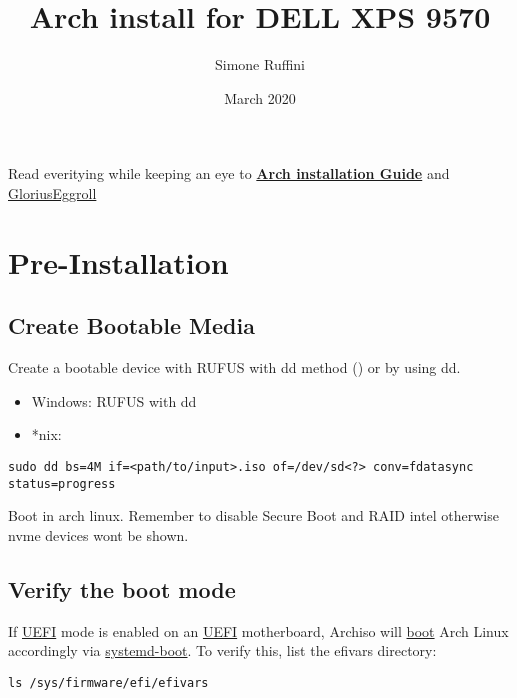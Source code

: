 \documentclass[12pt,A4]{article}
\title{Arch install for DELL XPS 9570}
\author{Simone Ruffini }
\date{March 2020}
\begin{document}
\maketitle
Read everitying while keeping an eye to \href{https://wiki.archlinux.org/index.php/Installation_guide}{\textbf{Arch installation Guide}} and \href{https://www.gloriouseggroll.tv/arch-linux-efi-install-guide/}{GloriusEggroll}
\section{Pre-Installation}
\subsection{Create Bootable Media}
Create a bootable device with RUFUS with dd method () or by using dd.
\begin{itemize}
    \item Windows: RUFUS with dd
    \item *nix:
\end{itemize}

\begin{verbatim}
sudo dd bs=4M if=<path/to/input>.iso of=/dev/sd<?> conv=fdatasync  status=progress
\end{verbatim}

\noindent Boot in arch linux. Remember to disable Secure Boot and RAID intel otherwise nvme devices wont be shown.
\subsection{Verify the boot mode}
If \href{https://wiki.archlinux.org/index.php/UEFI}{UEFI} mode is enabled on an \href{https://wiki.archlinux.org/index.php/UEFI}{UEFI} motherboard, Archiso will \href{https://wiki.archlinux.org/index.php/Boot}{boot} Arch Linux accordingly via \href{https://wiki.archlinux.org/index.php/Systemd-boot}{systemd-boot}. To verify this, list the efivars directory:
\begin{verbatim}
ls /sys/firmware/efi/efivars
\end{verbatim}
\end{document}
